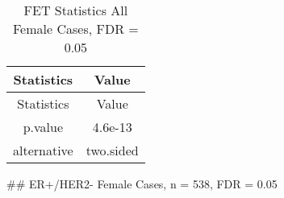 \documentclass[]{article}
\begin{document}
\begin{longtable}[]{@{}cc@{}}
\caption{FET Statistics All Female Cases, FDR = 0.05}\tabularnewline
\toprule
\begin{minipage}[b]{0.18\columnwidth}\centering\strut
Statistics\strut
\end{minipage} & \begin{minipage}[b]{0.14\columnwidth}\centering\strut
Value\strut
\end{minipage}\tabularnewline
\midrule
\endfirsthead
\toprule
\begin{minipage}[b]{0.18\columnwidth}\centering\strut
Statistics\strut
\end{minipage} & \begin{minipage}[b]{0.14\columnwidth}\centering\strut
Value\strut
\end{minipage}\tabularnewline
\midrule
\endhead
\begin{minipage}[t]{0.18\columnwidth}\centering\strut
p.value\strut
\end{minipage} & \begin{minipage}[t]{0.14\columnwidth}\centering\strut
4.6e-13\strut
\end{minipage}\tabularnewline
\begin{minipage}[t]{0.18\columnwidth}\centering\strut
alternative\strut
\end{minipage} & \begin{minipage}[t]{0.14\columnwidth}\centering\strut
two.sided\strut
\end{minipage}\tabularnewline
\bottomrule
\end{longtable}

\pagebreak
\#\# ER+/HER2- Female Cases, n = 538, FDR = 0.05
\end{document}
